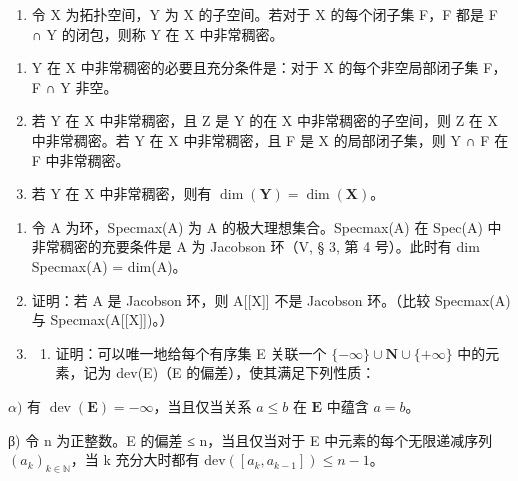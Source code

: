 
\begin{enumerate}
\def\labelenumi{\arabic{enumi})}
\tightlist
\item
  令 X 为拓扑空间，Y 为 X 的子空间。若对于 X 的每个闭子集 F，F 都是 F ∩ Y 的闭包，则称 Y 在 X 中非常稠密。
\end{enumerate}

\begin{enumerate}
\def\labelenumi{\alph{enumi})}
\item
  Y 在 X 中非常稠密的必要且充分条件是：对于 X 的每个非空局部闭子集 F，F ∩ Y 非空。
\item
  若 Y 在 X 中非常稠密，且 Z 是 Y 的在 X 中非常稠密的子空间，则 Z 在 X 中非常稠密。若 Y 在 X 中非常稠密，且 F 是 X 的局部闭子集，则 Y ∩ F 在 F 中非常稠密。
\item
  若 Y 在 X 中非常稠密，则有 \(\dim(\mathbf{Y}) = \dim(\mathbf{X})\)。
\end{enumerate}

\begin{enumerate}
\def\labelenumi{\arabic{enumi})}
\setcounter{enumi}{1}
\item
  令 A 为环，Specmax(A) 为 A 的极大理想集合。Specmax(A) 在 Spec(A) 中非常稠密的充要条件是 A 为 Jacobson 环（V, § 3, 第 4 号）。此时有 dim Specmax(A) = dim(A)。
\item
  证明：若 A 是 Jacobson 环，则 A{[}{[}X{]}{]} 不是 Jacobson 环。（比较 Specmax(A) 与 Specmax(A{[}{[}X{]}{]})。）
\item
  \begin{enumerate}
  \def\labelenumii{\alph{enumii})}
  \tightlist
  \item
    证明：可以唯一地给每个有序集 E 关联一个 \(\{-\infty\}\cup\mathbf{N}\cup\{+\infty\}\) 中的元素，记为 dev(E)（E 的偏差），使其满足下列性质：
  \end{enumerate}
\end{enumerate}

\(\alpha)\) 有 \(\operatorname{dev}(\mathbf{E}) = -\infty\)，当且仅当关系 \(a \leqslant b\) 在 \(\mathbf{E}\) 中蕴含 \(a = b\)。

β) 令 n 为正整数。E 的偏差 ≤ n，当且仅当对于 E 中元素的每个无限递减序列 \((a_{k})_{k\in\mathbb{N}}\)，当 k 充分大时都有 \(\text{dev}([a_{k}, a_{k-1}]) \leqslant n - 1\)。

